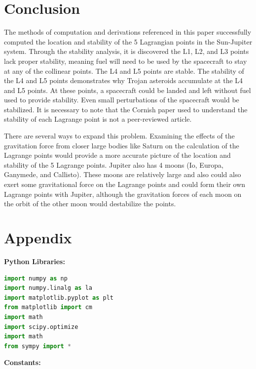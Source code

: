 \documentclass[linenumbers,RNAAS,trackchanges]{aastex631}
\begin{document}
\section{Conclusion} \label{sec:conclusion}
The methods of computation and derivations referenced in this paper successfully computed the location and stability of the 5 Lagrangian points in the Sun-Jupiter system. Through the stability analysis, it is discovered the L1, L2, and L3 points lack proper stability, meaning fuel will need to be used by the spacecraft to stay at any of the collinear points. The L4 and L5 points are stable. The stability of the L4 and L5 points demonstrates why Trojan asteroids accumulate at the L4 and L5 points. At these points, a spacecraft could be landed and left without fuel used to provide stability. Even small perturbations of the spacecraft would be stabilized. It is necessary to note that the Cornish paper used to understand the stability of each Lagrange point is not a peer-reviewed article.\cite{westra}

There are several ways to expand this problem. Examining the effects of the gravitation force from closer large bodies like Saturn on the calculation of the Lagrange points would provide a more accurate picture of the location and stability of the 5 Lagrange points. Jupiter also has 4 moons (Io, Europa, Ganymede, and Callisto). These moons are relatively large and also could also exert some gravitational force on the Lagrange points and could form their own Lagrange points with Jupiter, although the gravitation forces of each moon on the orbit of the other moon would destabilize the points. 

\section{Appendix} \label{sec:appendix}

\begin{center} \textbf{Python Libraries:} \end{center}

\begin{lstlisting}[language=Python]
import numpy as np
import numpy.linalg as la
import matplotlib.pyplot as plt
from matplotlib import cm
import math
import scipy.optimize
import math
from sympy import *
\end{lstlisting}

\begin{center} \textbf{Constants:} \end{center}
\end{document}
